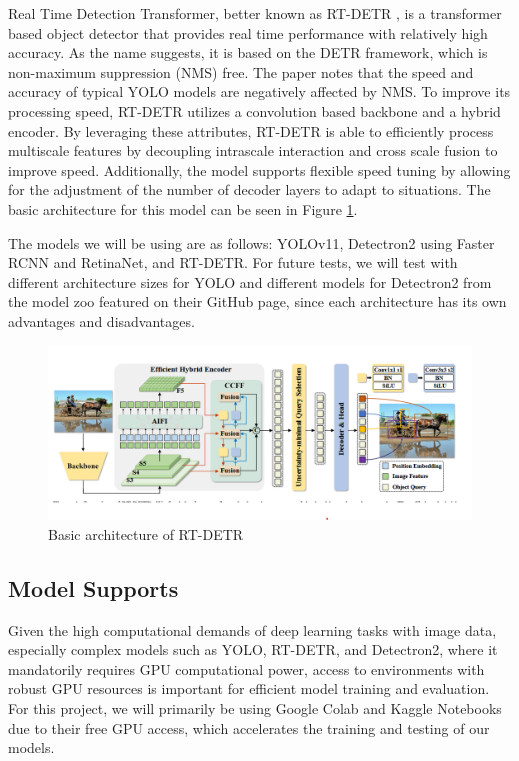 \documentclass[stu,12pt,floatsintext]{apa7}
\begin{document}
Real Time Detection Transformer, better known as RT-DETR \parencite{zhao_detrs_2024}, is a transformer based object detector that provides real time performance with relatively high accuracy. As the name suggests, it is based on the DETR framework, which is non-maximum suppression (NMS) free. The paper notes that the speed and accuracy of typical YOLO models are negatively affected by NMS. To improve its processing speed, RT-DETR utilizes a convolution based backbone and a hybrid encoder. By leveraging these attributes, RT-DETR is able to efficiently process multiscale features by decoupling intrascale interaction and cross scale fusion to improve speed. Additionally, the model supports flexible speed tuning by allowing for the adjustment of the number of decoder layers to adapt to situations. The basic architecture for this model can be seen in Figure \ref{fig:rt-detr}.


The models we will be using are as follows: YOLOv11, Detectron2 using Faster RCNN and RetinaNet, and RT-DETR. For future tests, we will test with different architecture sizes for YOLO and different models for Detectron2 from the model zoo featured on their GitHub page, since each architecture has its own advantages and disadvantages.

\begin{figure}
    \centering
    \includegraphics[width=0.75\linewidth]{rt-detr_architecture.png}
    \caption{Basic architecture of RT-DETR}
    \label{fig:rt-detr}
\end{figure}


\subsection{Model Supports}
Given the high computational demands of deep learning tasks with image data, especially complex models such as YOLO, RT-DETR, and Detectron2, where it mandatorily requires GPU computational power, access to environments with robust GPU resources is important for efficient model training and evaluation. For this project, we will primarily be using Google Colab and Kaggle Notebooks due to their free GPU access, which accelerates the training and testing of our models.
\end{document}
